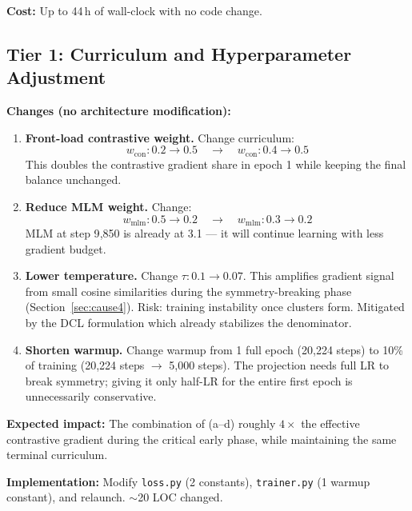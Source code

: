 \documentclass[11pt,a4paper]{article}
\begin{document}
\textbf{Cost:} Up to 44\,h of wall-clock with no code change.

\subsection{Tier 1: Curriculum and Hyperparameter Adjustment}
\label{sec:tier1}

\textbf{Changes (no architecture modification):}

\begin{enumerate}[label=\alph*)]
  \item \textbf{Front-load contrastive weight.} Change curriculum:
  \begin{equation}
  w_{\text{con}}: 0.2 \to 0.5 \quad\longrightarrow\quad w_{\text{con}}: 0.4 \to 0.5
  \end{equation}
  This doubles the contrastive gradient share in epoch 1 while keeping the final
  balance unchanged.

  \item \textbf{Reduce MLM weight.} Change:
  \begin{equation}
  w_{\text{mlm}}: 0.5 \to 0.2 \quad\longrightarrow\quad w_{\text{mlm}}: 0.3 \to 0.2
  \end{equation}
  MLM at step 9{,}850 is already at 3.1 --- it will continue learning with less
  gradient budget.

  \item \textbf{Lower temperature.} Change $\tau: 0.1 \to 0.07$. This amplifies
  gradient signal from small cosine similarities during the symmetry-breaking phase
  (Section~\ref{sec:cause4}). Risk: training instability once clusters form. Mitigated
  by the DCL formulation which already stabilizes the denominator.

  \item \textbf{Shorten warmup.} Change warmup from 1 full epoch (20{,}224 steps) to
  10\% of training (20{,}224 steps $\to$ 5{,}000 steps). The projection needs full LR
  to break symmetry; giving it only half-LR for the entire first epoch is unnecessarily
  conservative.
\end{enumerate}

\textbf{Expected impact:} The combination of (a--d) roughly $4\times$ the effective
contrastive gradient during the critical early phase, while maintaining the same
terminal curriculum.

\textbf{Implementation:} Modify \texttt{loss.py} (2 constants), \texttt{trainer.py}
(1 warmup constant), and relaunch. $\sim$20 LOC changed.
\end{document}
